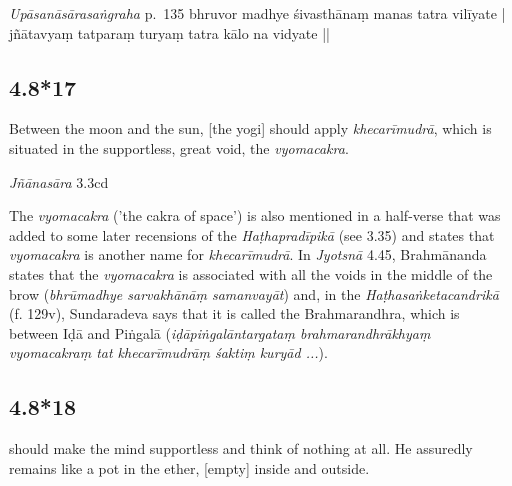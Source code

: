 \begin{ekdosis}
\begin{testimonia}[hp04_008_16]
\emph{Upāsanāsārasaṅgraha} p.~135
bhruvor madhye śivasthānaṃ manas tatra vilīyate |
jñātavyaṃ tatparaṃ turyaṃ tatra kālo na vidyate ||
\end{testimonia}


\subsection*{4.8*17}
\begin{translation}[hp04_008_17]
Between the moon and the sun, [the yogi] should apply \emph{khecarīmudrā}, which is situated in the supportless, great void, the \emph{vyomacakra}.
\end{translation}

\begin{sources}[hp04_008_17]
\emph{Jñānasāra} 3.3cd
\begin{versinnote}
\end{versinnote}

\end{sources}


\begin{philcomm}[hp04_008_17]
The \emph{vyomacakra} ('the cakra of space') is also mentioned in a half-verse that was added to some later recensions of the \emph{Haṭhapradīpikā} (see 3.35) and states that \emph{vyomacakra} is another name for \emph{khecarīmudrā}. In \emph{Jyotsnā} 4.45, Brahmānanda states that the \emph{vyomacakra} is associated with all the voids in the middle of the brow (\emph{bhrūmadhye sarvakhānāṃ samanvayāt}) and, in the \emph{Haṭhasaṅketacandrikā} (f. 129v), Sundaradeva says that it is called the Brahmarandhra, which is between Iḍā and Piṅgalā (\emph{iḍāpiṅgalāntargataṃ brahmarandhrākhyaṃ
vyomacakraṃ tat khecarīmudrāṃ śaktiṃ kuryād ...}). 
\end{philcomm}

\subsection*{4.8*18}
\begin{translation} should make the mind supportless and think of nothing at all. He assuredly remains like a pot in the ether, [empty] inside and outside.
\end{translation}


\end{ekdosis}
